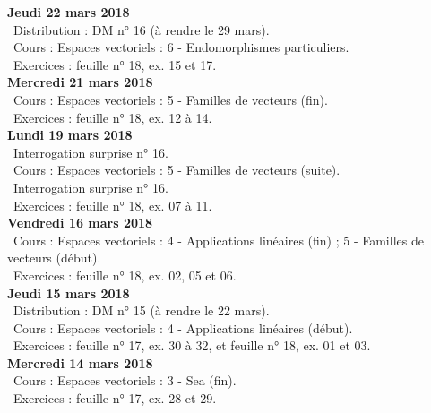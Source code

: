 \documentclass[12pt,a4paper]{article}
\begin{document}
\noindent\textbf{Jeudi 22 mars 2018}\\
\bu\ Distribution : DM n° 16 (à rendre le 29 mars).\\
\bu\ Cours : Espaces vectoriels : 6 - Endomorphismes particuliers.\\
\bu\ Exercices : feuille n° 18, ex. 15 et 17.\vspace{.4cm}\\

\noindent\textbf{Mercredi 21 mars 2018} \\
\bu\ Cours : Espaces vectoriels : 5 - Familles de vecteurs (fin).\\
\bu\ Exercices : feuille n° 18, ex. 12 à 14.\vspace{.4cm}\\

\noindent\textbf{\bf Lundi 19 mars 2018} \\
\bu\ Interrogation surprise n° 16.\\
\bu\ Cours : Espaces vectoriels : 5 - Familles de vecteurs (suite).\\
\bu\ Interrogation surprise n° 16.\\
\bu\ Exercices : feuille n° 18, ex. 07 à 11.\vspace{.4cm}\\

\noindent\textbf{Vendredi 16 mars 2018}\\
\bu\ Cours : Espaces vectoriels : 4 - Applications linéaires (fin) ; 5 - Familles de vecteurs (début).\\
\bu\ Exercices : feuille n° 18, ex. 02, 05 et 06.\vspace{.4cm}\\

\noindent\textbf{Jeudi 15 mars 2018}\\
\bu\ Distribution : DM n° 15 (à rendre le 22 mars).\\
\bu\ Cours : Espaces vectoriels : 4 - Applications linéaires (début).\\
\bu\ Exercices : feuille n° 17, ex. 30 à 32, et feuille n° 18, ex. 01 et 03.\vspace{.4cm}\\

\noindent\textbf{Mercredi 14 mars 2018} \\
\bu\ Cours : Espaces vectoriels : 3 - Sea (fin).\\
\bu\ Exercices : feuille n° 17, ex. 28 et 29.\vspace{.4cm}\\
\end{document}
